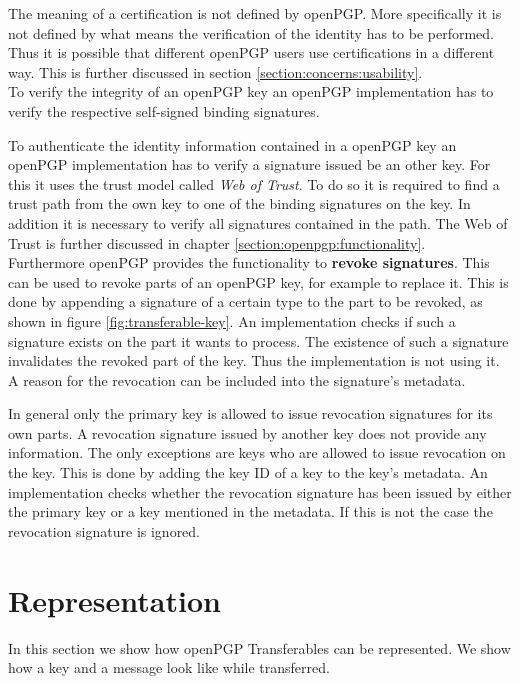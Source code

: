 The meaning of a certification is not defined by openPGP. More specifically it is not defined by what means the verification of the identity has to be performed. Thus it is possible that different openPGP users use certifications in a different way. This is further discussed in section \ref{section:concerns:usability}. \\

To verify the integrity of an openPGP key an openPGP implementation has to verify the respective self-signed binding signatures. 

To authenticate the identity information contained in a openPGP key an openPGP implementation has to verify a signature issued be an other key. For this it uses the trust model called \textit{Web of Trust}. To do so it is required to find a trust path from the own key to one of the binding signatures on the key. In addition it is necessary to verify all signatures contained in the path. The Web of Trust is further discussed in chapter \ref{section:openpgp:functionality}. \\

Furthermore openPGP provides the functionality to \textbf{revoke signatures}. This can be used to revoke parts of an openPGP key, for example to replace it. This is done by appending a signature of a certain type to the part to be revoked, as shown in figure \ref{fig:transferable-key}. An implementation checks if such a signature exists on the part it wants to process. The existence of such a signature invalidates the revoked part of the key. Thus the implementation is not using it. A reason for the revocation can be included into the signature's metadata. 

In general only the primary key is allowed to issue revocation signatures for its own parts. A revocation signature issued by another key does not provide any information. The only exceptions are keys who are allowed to issue revocation on the key. This is done by adding the key ID of a key to the key's metadata. An implementation checks whether the revocation signature has been issued by either the primary key or a key mentioned in the metadata. If this is not the case the revocation signature is ignored.

\section{Representation}
\label{section:messageformat:asciia}

In this section we show how openPGP Transferables can be represented. We show how a key and a message look like while transferred. \\

